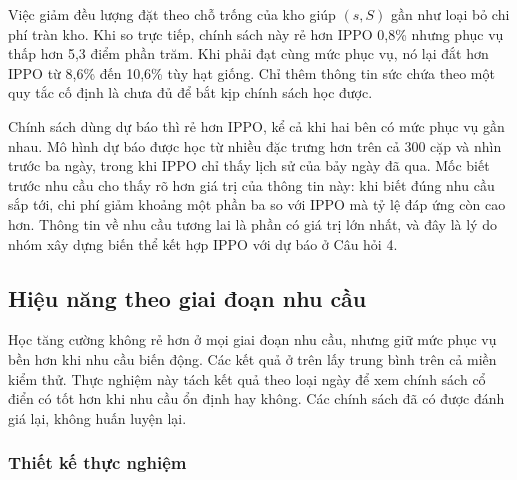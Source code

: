 Việc giảm đều lượng đặt theo chỗ trống của kho giúp $(s, S)$ gần như loại bỏ chi phí tràn kho. Khi so trực tiếp, chính sách này rẻ hơn IPPO 0,8\% nhưng phục vụ thấp hơn 5,3 điểm phần trăm. Khi phải đạt cùng mức phục vụ, nó lại đắt hơn IPPO từ 8,6\% đến 10,6\% tùy hạt giống. Chỉ thêm thông tin sức chứa theo một quy tắc cố định là chưa đủ để bắt kịp chính sách học được.

Chính sách dùng dự báo thì rẻ hơn IPPO, kể cả khi hai bên có mức phục vụ gần nhau. Mô hình dự báo được học từ nhiều đặc trưng hơn trên cả 300 cặp và nhìn trước ba ngày, trong khi IPPO chỉ thấy lịch sử của bảy ngày đã qua. Mốc biết trước nhu cầu cho thấy rõ hơn giá trị của thông tin này: khi biết đúng nhu cầu sắp tới, chi phí giảm khoảng một phần ba so với IPPO mà tỷ lệ đáp ứng còn cao hơn. Thông tin về nhu cầu tương lai là phần có giá trị lớn nhất, và đây là lý do nhóm xây dựng biến thể kết hợp IPPO với dự báo ở Câu hỏi 4.

\subsection{Hiệu năng theo giai đoạn nhu cầu}
\label{subsec:hanChe}

Học tăng cường không rẻ hơn ở mọi giai đoạn nhu cầu, nhưng giữ mức phục vụ bền hơn khi nhu cầu biến động. Các kết quả ở trên lấy trung bình trên cả miền kiểm thử. Thực nghiệm này tách kết quả theo loại ngày để xem chính sách cổ điển có tốt hơn khi nhu cầu ổn định hay không. Các chính sách đã có được đánh giá lại, không huấn luyện lại.

\subsubsection{Thiết kế thực nghiệm}

